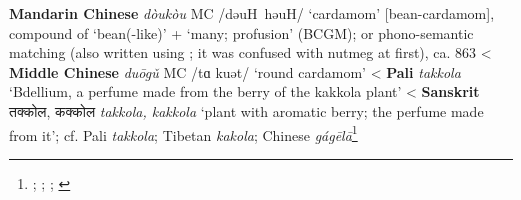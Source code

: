 \begin{etymology}\label{ety:doukou}
\textbf{Mandarin Chinese} {} \textit{dòukòu} MC /dəuH həuH/ `cardamom' [bean-cardamom], compound of  `bean(-like)' +  `many; profusion' (BCGM); or phono-semantic matching (also written using ; it was confused with nutmeg at first), ca. 863
< \textbf{Middle Chinese}  \textit{duōgǔ} MC /tɑ kuət/ `round cardamom'
< \textbf{Pali} \textit{takkola} `Bdellium, a perfume made from the berry of the kakkola plant'
< \textbf{Sanskrit} {तक्कोल, कक्कोल} \textit{takkola, kakkola} `plant with aromatic berry; the perfume made from it'; cf. Pali \textit{takkola}; Tibetan  \textit{kakola}; Chinese  \textit{gágēlā}\footnote{\textcite[22]{donkin_between_2003}; \textcite[18:55]{yyzz}; \textcite[292]{pali_text_society_pali_1921}; \textcite[431, 241]{monier-williams_sanskrit-english_1899}}
\end{etymology}